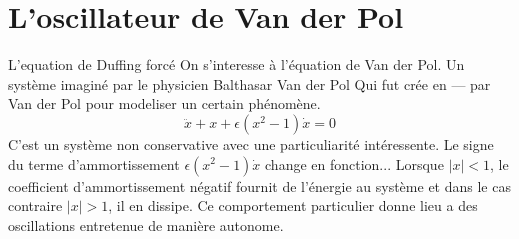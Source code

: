 \chapter{L'oscillateur de Van der Pol}
%
L'equation de Duffing forcé
On s'interesse à l'équation de Van der Pol. Un système imaginé par le physicien Balthasar Van der Pol 
Qui fut crée en --- par Van der Pol pour modeliser un certain phénomène.
%
\begin{equation}
    \ddot{x} + x + \epsilon(x^2 - 1)\dot{x} = 0
    \label{eq:vdp}
\end{equation}
%
C'est un système non conservative avec une particuliarité intéressente. 
Le signe du terme d'ammortissement $\epsilon(x^2 - 1)\dot{x}$ change en fonction... 
Lorsque $|x|<1$, le coefficient d'ammortissement négatif fournit de l'énergie au système et dans le cas contraire $|x|>1$, il en dissipe. 
Ce comportement particulier donne lieu a des oscillations entretenue de manière autonome.
%

